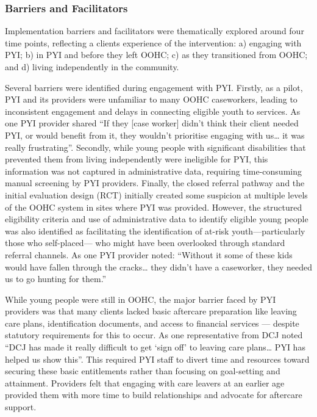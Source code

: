 \documentclass[
  jou,
  floatsintext,
  longtable,
  nolmodern,
  notxfonts,
  notimes,
  colorlinks=true,linkcolor=blue,citecolor=blue,urlcolor=blue]{apa7}
\begin{document}
\subsubsection{Barriers and
Facilitators}\label{barriers-and-facilitators}

Implementation barriers and facilitators were thematically explored
around four time points, reflecting a clients experience of the
intervention: a) engaging with PYI; b) in PYI and before they left OOHC;
c) as they transitioned from OOHC; and d) living independently in the
community.

Several barriers were identified during engagement with PYI. Firstly, as
a pilot, PYI and its providers were unfamiliar to many OOHC caseworkers,
leading to inconsistent engagement and delays in connecting eligible
youth to services. As one PYI provider shared ``If they {[}case
worker{]} didn't think their client needed PYI, or would benefit from
it, they wouldn't prioritise engaging with us\ldots{} it was really
frustrating''. Secondly, while young people with significant
disabilities that prevented them from living independently were
ineligible for PYI, this information was not captured in administrative
data, requiring time-consuming manual screening by PYI providers.
Finally, the closed referral pathway and the initial evaluation design
(RCT) initially created some suspicion at multiple levels of the OOHC
system in sites where PYI was provided. However, the structured
eligibility criteria and use of administrative data to identify eligible
young people was also identified as facilitating the identification of
at-risk youth---particularly those who self-placed--- who might have
been overlooked through standard referral channels. As one PYI provider
noted: ``Without it some of these kids would have fallen through the
cracks\ldots{} they didn't have a caseworker, they needed us to go
hunting for them.''

While young people were still in OOHC, the major barrier faced by PYI
providers was that many clients lacked basic aftercare preparation like
leaving care plans, identification documents, and access to financial
services --- despite statutory requirements for this to occur. As one
representative from DCJ noted ``DCJ has made it really difficult to get
`sign off' to leaving care plans\ldots{} PYI has helped us show this''.
This required PYI staff to divert time and resources toward securing
these basic entitlements rather than focusing on goal-setting and
attainment. Providers felt that engaging with care leavers at an earlier
age provided them with more time to build relationships and advocate for
aftercare support.
\end{document}
